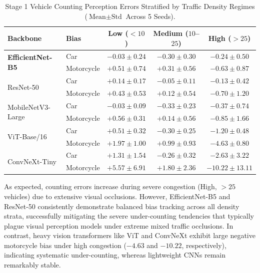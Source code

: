 \documentclass[preprint,12pt]{elsarticle}
\begin{document}
\begin{table}[htbp]
\centering
\footnotesize
\setlength{\tabcolsep}{4pt}
\renewcommand{\arraystretch}{1.1}
\caption{Stage 1 Vehicle Counting Perception Errors Stratified by Traffic Density Regimes ($\text{Mean} \pm \text{Std}$ Across 5 Seeds).}
\label{tab:stage1_density}
\begin{tabular}{llccc}
\toprule
\textbf{Backbone} & \textbf{Bias} & \textbf{Low ($<10$)} & \textbf{Medium ($10$--$25$)} & \textbf{High ($>25$)} \\
\midrule
\multirow{2}{*}{\textbf{EfficientNet-B5}} & Car & $-0.03 \pm 0.24$ & $-0.30 \pm 0.30$ & $-0.24 \pm 0.50$ \\
 & Motorcycle & $+0.51 \pm 0.74$ & $+0.31 \pm 0.56$ & $-0.63 \pm 0.87$ \\
\midrule
\multirow{2}{*}{ResNet-50} & Car & $+0.14 \pm 0.17$ & $-0.05 \pm 0.11$ & $-0.13 \pm 0.42$ \\
 & Motorcycle & $+0.43 \pm 0.53$ & $+0.12 \pm 0.54$ & $-0.70 \pm 1.20$ \\
\midrule
\multirow{2}{*}{MobileNetV3-Large} & Car & $-0.03 \pm 0.09$ & $-0.33 \pm 0.23$ & $-0.37 \pm 0.74$ \\
 & Motorcycle & $+0.56 \pm 0.31$ & $+0.14 \pm 0.56$ & $-0.85 \pm 1.66$ \\
\midrule
\multirow{2}{*}{ViT-Base/16} & Car & $+0.51 \pm 0.32$ & $-0.30 \pm 0.25$ & $-1.20 \pm 0.48$ \\
 & Motorcycle & $+1.97 \pm 1.00$ & $+0.99 \pm 0.93$ & $-4.63 \pm 0.80$ \\
\midrule
\multirow{2}{*}{ConvNeXt-Tiny} & Car & $+1.31 \pm 1.54$ & $-0.26 \pm 0.32$ & $-2.63 \pm 3.22$ \\
 & Motorcycle & $+5.57 \pm 6.91$ & $+1.80 \pm 2.36$ & $-10.22 \pm 13.11$ \\
\bottomrule
\end{tabular}
\end{table}

As expected, counting errors increase during severe congestion (High, $>25$ vehicles) due to extensive visual occlusions. However, EfficientNet-B5 and ResNet-50 consistently demonstrate balanced bias tracking across all density strata, successfully mitigating the severe under-counting tendencies that typically plague visual perception models under extreme mixed traffic occlusions. In contrast, heavy vision transformers like ViT and ConvNeXt exhibit large negative motorcycle bias under high congestion ($-4.63$ and $-10.22$, respectively), indicating systematic under-counting, whereas lightweight CNNs remain remarkably stable.
\end{document}

